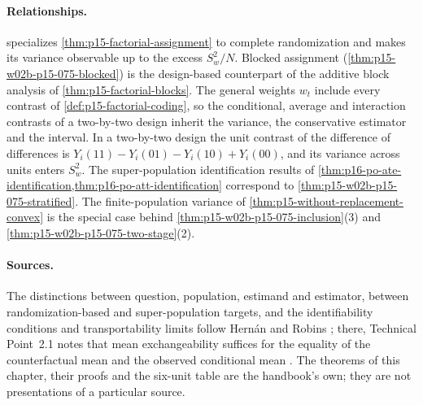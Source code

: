 \paragraph{Relationships.}
 specializes
\cref{thm:p15-factorial-assignment} to complete randomization and makes its
variance observable up to the excess \(S_w^2/N\). Blocked assignment
(\cref{thm:p15-w02b-p15-075-blocked}) is the design-based counterpart of the
additive block analysis of \cref{thm:p15-factorial-blocks}. The general
weights \(w_t\) include every contrast of \cref{def:p15-factorial-coding}, so
the conditional, average and interaction contrasts of a two-by-two design
inherit the variance, the conservative estimator and the interval. In a
two-by-two design the unit contrast of the difference of differences is
\(Y_i(11)-Y_i(01)-Y_i(10)+Y_i(00)\), and its variance across units enters
\(S_w^2\). The super-population identification results of
\cref{thm:p16-po-ate-identification,thm:p16-po-att-identification} correspond
to \cref{thm:p15-w02b-p15-075-stratified}. The finite-population variance of
\cref{thm:p15-without-replacement-convex} is the special case behind
\cref{thm:p15-w02b-p15-075-inclusion}(3) and
\cref{thm:p15-w02b-p15-075-two-stage}(2).

\paragraph{Sources.}
The distinctions between question, population, estimand and estimator, between
randomization-based and super-population targets, and the identifiability
conditions and transportability limits follow Hern\'an and Robins
\cite[ch.~2, p.~13; \S2.1, pp.~14--15; ch.~3, pp.~27--28; \S4.3, p.~52;
Fine Point~4.2, p.~54; \S\S10.1--10.3, pp.~138--144]{HernanRobins2020WhatIf2026};
there, Technical Point~2.1 notes that mean exchangeability suffices for the
equality of the counterfactual mean and the observed conditional mean
\cite[\S2.1, p.~15]{HernanRobins2020WhatIf2026}. The theorems of this chapter,
their proofs and the six-unit table are the handbook's own; they are not
presentations of a particular source.
